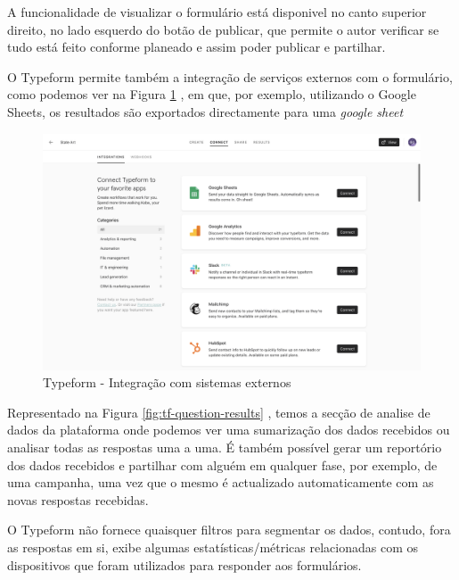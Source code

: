\newpage

 A funcionalidade de visualizar o formulário está disponivel no canto superior direito, no lado esquerdo do botão de publicar, que permite o autor verificar se tudo está feito conforme planeado e assim poder publicar e partilhar.
 
 O Typeform permite também a integração de serviços externos com o formulário, como podemos ver na Figura \ref{fig:tf-question-integration} , em que, por exemplo, utilizando o Google Sheets\cite{googlesheets}, os resultados são exportados directamente para uma \textit{google sheet}


\begin{figure}[ht!]
	\begin{center}
		\includegraphics[width=1\textwidth]{img/tf/tf-question-integration}
		\caption{Typeform - Integração com sistemas externos}
		\label{fig:tf-question-integration}
	\end{center}
\end{figure}

Representado na Figura \ref{fig:tf-question-results} , temos a secção de analise de dados da plataforma onde podemos ver uma sumarização dos dados recebidos ou  analisar todas as respostas uma a uma. É também possível gerar um reportório dos dados recebidos e partilhar com alguém em qualquer fase, por exemplo, de uma campanha, uma vez que o mesmo é actualizado automaticamente com as novas respostas recebidas. 

O Typeform não fornece quaisquer filtros para segmentar os dados, contudo, fora as respostas em si, exibe algumas estatísticas/métricas relacionadas com os dispositivos que foram utilizados para responder aos formulários.


